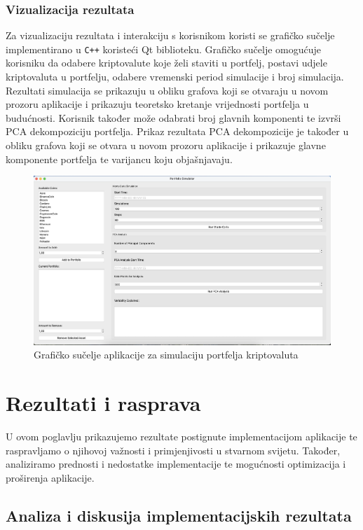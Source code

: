 \documentclass[zavrsnirad, upload]{fer}
\begin{document}
\subsection{Vizualizacija rezultata}
\label{sek:vizualizacija_rezultata}
Za vizualizaciju rezultata i interakciju s korisnikom koristi se
grafičko sučelje implementirano u \texttt{C++} koristeći Qt biblioteku.
Grafičko sučelje omogućuje korisniku da odabere kriptovalute koje želi
staviti u portfelj, postavi udjele kriptovaluta u portfelju,
odabere vremenski period simulacije i broj simulacija.
Rezultati simulacija se prikazuju u obliku grafova koji
se otvaraju u novom prozoru aplikacije i prikazuju teoretsko kretanje
vrijednosti portfelja u budućnosti. Korisnik također može odabrati
broj glavnih komponenti te izvrši PCA dekompoziciju portfelja. Prikaz
rezultata PCA dekompozicije je također u obliku grafova koji
se otvara u novom prozoru aplikacije i prikazuje glavne komponente
portfelja te varijancu koju objašnjavaju.
\begin{figure}[H]
    \centering
    \includegraphics[width=1.0\textwidth]{Figures/gui.png}
    \caption{Grafičko sučelje aplikacije za simulaciju portfelja kriptovaluta}
    \label{fig:portfolio_gui}
\end{figure}

\chapter{Rezultati i rasprava}
\label{pog:rezultati_i_rasprava}
U ovom poglavlju prikazujemo rezultate postignute implementacijom aplikacije
te raspravljamo o njihovoj važnosti i primjenjivosti u stvarnom svijetu.
Također, analiziramo prednosti i nedostatke implementacije te mogućnosti
optimizacija i proširenja aplikacije.
\section{Analiza i diskusija implementacijskih rezultata}
\label{sek:implementacijski_rezultati}
\end{document}
